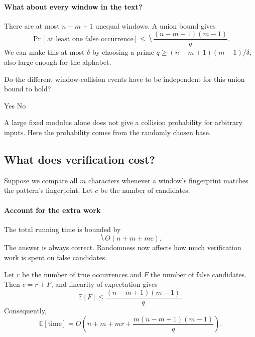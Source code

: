 \documentclass[11pt]{article}
\begin{document}
\paragraph{What about every window in the text?}
There are at most $n-m+1$ unequal windows. A union bound gives
\begin{equation*}
    \Pr[\text{at least one false occurrence}]
        \leq\hide{\frac{(n-m+1)(m-1)}q}.
\end{equation*}
We can make this at most $\delta$ by choosing a prime
$q\geq(n-m+1)(m-1)/\delta$, also large enough for the alphabet.

\begin{Qu}
    Do the different window-collision events have to be independent for
    this union bound to hold?
    \begin{itemize}
        \aitem Yes
        \bitem No
    \end{itemize}
\end{Qu}

\vfill
A large fixed modulus alone does not give a collision probability for arbitrary
inputs. Here the probability comes from the randomly chosen base.

\newpage
\subsection*{What does verification cost?}
Suppose we compare all $m$ characters whenever a window's fingerprint matches
the pattern's fingerprint. Let $c$ be the number of candidates.

\paragraph{Account for the extra work}
The total running time is bounded by
\begin{equation*}
    \hide{O(n+m+mc)}.
\end{equation*}
The answer is always correct. Randomness now affects how much verification
work is spent on false candidates.

Let $r$ be the number of true occurrences and $F$ the number of false
candidates. Then $c=r+F$, and linearity of expectation gives
\begin{equation*}
    \mathbb E[F]\leq\frac{(n-m+1)(m-1)}q.
\end{equation*}
Consequently,
\begin{equation*}
    \mathbb E[\text{time}]
      =O\left(n+m+mr+\frac{m(n-m+1)(m-1)}q\right).
\end{equation*}
\end{document}
